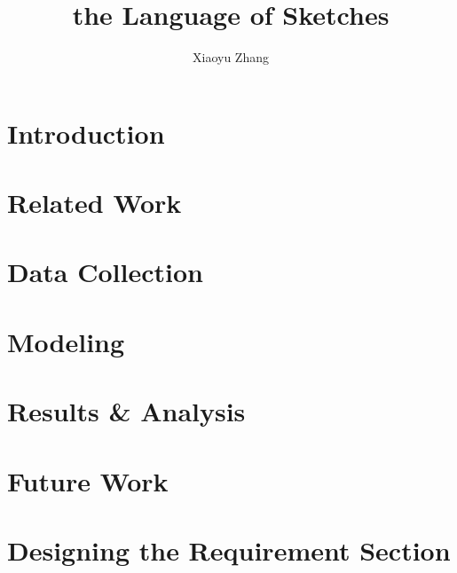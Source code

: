 \documentclass[twoside]{report}
\begin{document}
    \title{the Language of Sketches}
\author{Xiaoyu Zhang}

\beforepreface
{}



\afterpreface

\chapter{Introduction} \label{introductionChapter}


\chapter{Related Work} \label{relatedWorkChapter}


\chapter{Data Collection} \label{dataChapter}


\chapter{Modeling} \label{modelingChapter}


\chapter{Results \& Analysis} \label{analysisChapter}



\chapter{Future Work} \label{futureChapter}


\appendix
\chapter{Designing the Requirement Section} \label{appendixDataV1Req}


\renewcommand{\bibname}{Bibliography}


\end{document}
